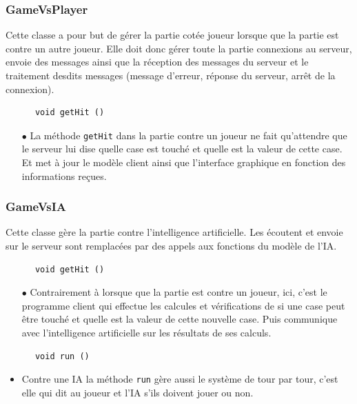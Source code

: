 \documentclass[12pt]{article}
\begin{document}
\subsubsection{GameVsPlayer}
Cette classe a pour but de gérer la partie cotée joueur lorsque que la partie
est contre un autre joueur. Elle doit donc gérer toute la partie connexions au
serveur, envoie des messages ainsi que la réception des messages du serveur et
le traitement desdits messages (message d'erreur, réponse du serveur, arrêt de
la connexion).
\bigskip
\begin{verbatim}
      void getHit ()
\end{verbatim}
\begin{itemize}
      \item[$\bullet$] La méthode \texttt{getHit} dans la partie contre un
            joueur ne fait
            qu'attendre que le serveur lui dise quelle case est touché et
            quelle est la valeur de cette case. Et met à jour le modèle client
            ainsi que l'interface graphique en fonction des informations
            reçues.
\end{itemize}

\subsubsection{GameVsIA}
Cette classe gère la partie contre l'intelligence artificielle. Les écoutent et
envoie sur le serveur sont remplacées par des appels aux fonctions du modèle de
l'IA\@.
\bigskip
\begin{verbatim}
      void getHit ()
\end{verbatim}
\begin{itemize}
      \item[$\bullet$] Contrairement à lorsque que la partie est contre un
            joueur, ici,
            c'est le programme client qui effectue les calcules et
            vérifications de si une case peut être touché et quelle est la
            valeur de cette nouvelle case. Puis communique avec l'intelligence
            artificielle sur les résultats de ses calculs.
\end{itemize}
\bigskip
\begin{verbatim}
      void run ()
\end{verbatim}
\begin{itemize}
      \item Contre une IA la méthode \texttt{run} gère aussi le système de tour
            par tour, c'est elle qui dit au joueur et l'IA s'ils doivent jouer
            ou non.
\end{itemize}
\end{document}
